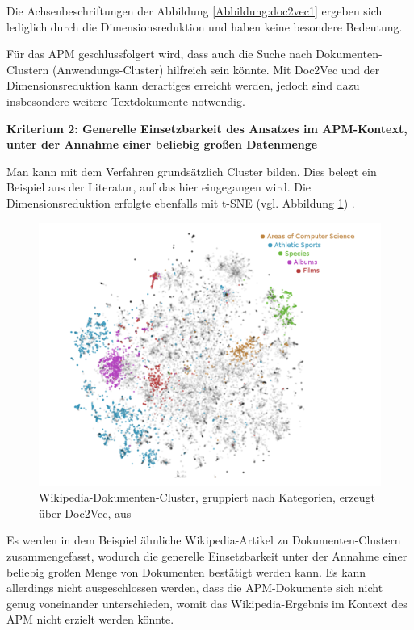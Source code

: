 Die Achsenbeschriftungen der Abbildung \ref{Abbildung:doc2vec1} ergeben sich lediglich durch die Dimensionsreduktion und haben keine besondere Bedeutung.

Für das APM geschlussfolgert wird, dass auch die Suche nach Dokumenten-Clustern (Anwendungs-Cluster) hilfreich sein könnte. Mit Doc2Vec und der Dimensionsreduktion kann derartiges erreicht werden, jedoch sind dazu insbesondere weitere Textdokumente notwendig.

{\bf Kriterium 2: Generelle Einsetzbarkeit des Ansatzes im APM-Kontext, unter der Annahme einer beliebig großen Datenmenge}

Man kann mit dem Verfahren grundsätzlich Cluster bilden. Dies belegt ein Beispiel aus der Literatur, auf das hier eingegangen wird. Die Dimensionsreduktion erfolgte ebenfalls mit t-SNE (vgl. Abbildung \ref{Abbildung:doc2vec2}) \cite{Dai}. 

\begin{figure}[h]
\centering
\includegraphics[scale=0.95]{content/pics/Picture_15.png}
\caption{Wikipedia-Dokumenten-Cluster, gruppiert nach Kategorien, erzeugt über Doc2Vec, aus \cite{Dai}}
\label{Abbildung:doc2vec2}
\end{figure}

Es werden in dem Beispiel ähnliche Wikipedia-Artikel zu Dokumenten-Clustern zusammengefasst, wodurch die generelle Einsetzbarkeit unter der Annahme einer beliebig großen Menge von Dokumenten bestätigt werden kann. Es kann allerdings nicht ausgeschlossen werden, dass die APM-Dokumente sich nicht genug voneinander unterschieden, womit das Wikipedia-Ergebnis im Kontext des APM nicht erzielt werden könnte. 


